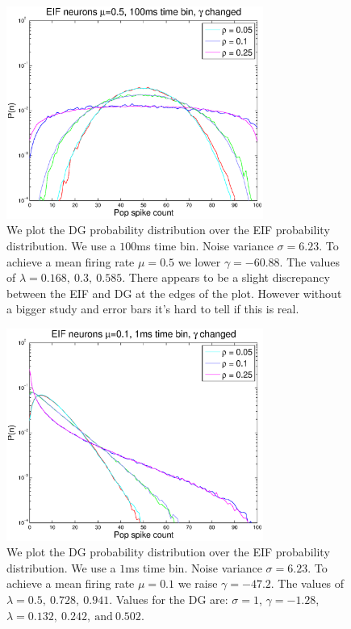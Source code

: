 \documentclass[11pt]{article}
\begin{document}
\begin{figure}[H]
\centering
\includegraphics[width=0.75\textwidth]{../Figures/EIF/DG_EIF_Macke_2a_mu_05_100ms_semilog}
\caption{\footnotesize We plot the DG probability distribution over the EIF probability distribution. We use a $100$ms time bin. Noise variance $\sigma = 6.23$. To achieve  a mean firing rate $\mu = 0.5$ we lower $\gamma =-60.88$. The values of $\lambda = 0.168,~0.3,~0.585$. There appears to be a slight discrepancy between the EIF and DG at the edges of the plot. However without a bigger study and error bars it's hard to tell if this is real.}
\label{figdgeif}
\end{figure}

\newpage

\begin{figure}[H]
\centering
\includegraphics[width=0.75\textwidth]{../Figures/EIF/DG_EIF_Macke_2a_mu_01_1ms_semilog}
\caption{\footnotesize We plot the DG probability distribution over the EIF probability distribution. We use a $1$ms time bin. Noise variance $\sigma = 6.23$. To achieve  a mean firing rate $\mu = 0.1$ we raise $\gamma =-47.2$. The values of $\lambda = 0.5,~0.728,~0.941$. Values for the DG are: $\sigma = 1$, $\gamma = -1.28$, $\lambda = 0.132,~0.242,~\text{and}~0.502$.}
\label{figdgeif}
\end{figure}
\end{document}
